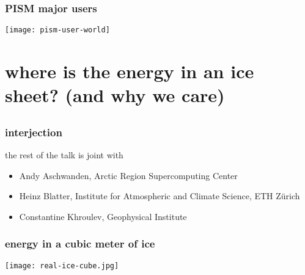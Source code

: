 \documentclass{beamer}
\begin{document}
\begin{frame}
  \frametitle{PISM major users}

\begin{center}
    \texttt{[image: pism-user-world]}
\end{center}
\end{frame}


\section[where's the energy?]{where is the energy in an ice sheet? (and why we care)}\subsection*{}

\begin{frame}
  \frametitle{interjection}

the rest of the talk is joint with 
\begin{itemize}
\item Andy Aschwanden, Arctic Region Supercomputing Center
\item Heinz Blatter, Institute for Atmospheric and Climate Science, ETH Z\"urich
\item Constantine Khroulev, Geophysical Institute
\end{itemize}
\end{frame}


\begin{frame}
  \frametitle{energy in a cubic meter of ice}

  \begin{center}
    \texttt{[image: real-ice-cube.jpg]}
  \end{center}
\end{frame}
\end{document}
